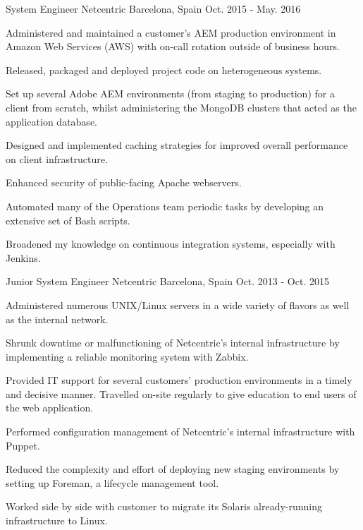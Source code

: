 \begin{cventries}
  \cventry
    {System Engineer} %
    {Netcentric} %
    {Barcelona, Spain} %
    {Oct. 2015 - May. 2016} %
    {
      \begin{cvitems} %
      \item {Administered and maintained a customer’s AEM production environment in Amazon Web Services (AWS) with on-call rotation outside of business hours.}
        \item {Released, packaged and deployed project code on heterogeneous systems.}
        \item {Set up several Adobe AEM environments (from staging to production) for a client from scratch, whilst administering the MongoDB clusters that acted as the application database.}
        \item {Designed and implemented caching strategies for improved overall performance on client infrastructure.}
        \item {Enhanced security of public-facing Apache webservers.}
        \item {Automated many of the Operations team periodic tasks by developing an extensive set of Bash scripts.}
        \item {Broadened my knowledge on continuous integration systems, especially with Jenkins.}
      \end{cvitems}
    }

  \cventry
    {Junior System Engineer} %
    {Netcentric} %
    {Barcelona, Spain} %
    {Oct. 2013 - Oct. 2015} %
    {
      \begin{cvitems} %
        \item {Administered numerous UNIX/Linux servers in a wide variety of flavors as well as the internal network.}
        \item {Shrunk downtime or malfunctioning of Netcentric’s internal infrastructure by implementing a reliable monitoring system with Zabbix.}
        \item {Provided IT support for several customers’ production environments in a timely and decisive manner. Travelled on-site regularly to give education to end users of the web application.}
        \item {Performed configuration management of Netcentric’s internal infrastructure with Puppet.}
        \item {Reduced the complexity and effort of deploying new staging environments by setting up Foreman, a lifecycle management tool.}
        \item {Worked side by side with customer to migrate its Solaris already-running infrastructure to Linux.}
      \end{cvitems}
    }


\end{cventries}
